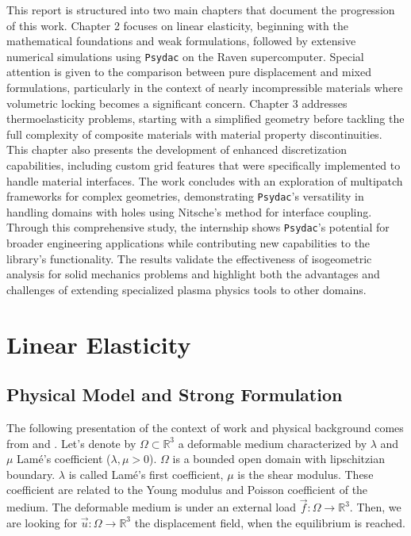\documentclass[a4paper,12pt,twoside]{report}
\newcommand{\mtr}{\mathbb{R}}
\begin{document}
This report is structured into two main chapters that document the progression of this work. Chapter 2 focuses on linear elasticity, beginning with the mathematical foundations and weak formulations, followed by extensive numerical simulations using \texttt{Psydac} on the Raven supercomputer. Special attention is given to the comparison between pure displacement and mixed formulations, particularly in the context of nearly incompressible materials where volumetric locking becomes a significant concern. Chapter 3 addresses thermoelasticity problems, starting with a simplified geometry before tackling the full complexity of composite materials with material property discontinuities. This chapter also presents the development of enhanced discretization capabilities, including custom grid features that were specifically implemented to handle material interfaces. The work concludes with an exploration of multipatch frameworks for complex geometries, demonstrating \texttt{Psydac}'s versatility in handling domains with holes using Nitsche's method for interface coupling.\\

Through this comprehensive study, the internship shows \texttt{Psydac}'s potential for broader engineering applications while contributing new capabilities to the library's functionality. The results validate the effectiveness of isogeometric analysis for solid mechanics problems and highlight both the advantages and challenges of extending specialized plasma physics tools to other domains.

\chapter{Linear Elasticity}
\label{chap:linear_elasticity}

\section{Physical Model and Strong Formulation}
The following presentation of the context of work and physical background comes from \cite{gould_introduction_2013} and \cite{ern_theory_2004}.
Let's denote by $\Omega \subset \mtr^3$ a deformable medium characterized by $\lambda$ and $\mu$ Lamé's coefficient ($\lambda, \mu > 0$). $\Omega$ is a bounded open domain with lipschitzian boundary. $\lambda$ is called Lamé's first coefficient, $\mu$ is the shear modulus. These coefficient are related to the Young modulus and Poisson coefficient of the medium. The deformable medium is under an external load $\vec f : \Omega \rightarrow \mtr^3$. Then, we are looking for $\vec u : \Omega \rightarrow \mtr^3$ the displacement field, when the equilibrium is reached. 
\end{document}
